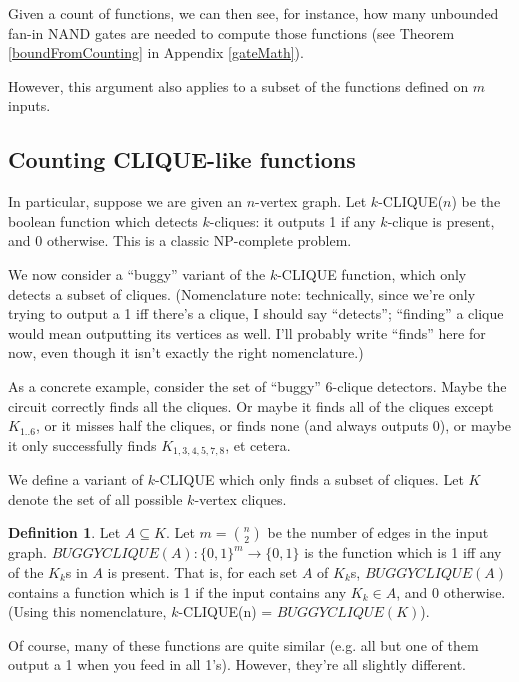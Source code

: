 \documentclass[12pt]{article}
\theoremstyle{definition}
\newtheorem{defn}{Definition}[section]
\begin{document}
Given a count of functions, we can then see, for instance,
how many unbounded fan-in NAND gates are needed to compute
those functions (see Theorem \ref{boundFromCounting}
in Appendix \ref{gateMath}).

However, this argument also applies to a subset of the functions defined
on $m$ inputs.

\subsection{Counting CLIQUE-like functions}

In particular, suppose we are given an $n$-vertex graph.
Let $k$-CLIQUE($n$) be the boolean function which
detects $k$-cliques: it outputs 1 if any $k$-clique
is present, and 0 otherwise. This is a classic
NP-complete problem.

We now consider a ``buggy'' variant of the $k$-CLIQUE function,
which only detects a subset of cliques. (Nomenclature note:
technically, since
we're only trying to output a 1 iff there's a clique, I should say
``detects''; ``finding'' a clique would mean outputting its
vertices as well. I'll probably write ``finds'' here for now,
even though it isn't exactly the right nomenclature.)

As a concrete example,
consider the set of ``buggy'' 6-clique detectors.
Maybe the circuit correctly
finds all the cliques. Or maybe it finds all of the cliques except $K_{1..6}$,
or it misses half the cliques, or finds none (and always outputs 0), or maybe
it only successfully finds $K_{1,3,4,5,7,8}$, et cetera.

We define a variant of $k$-CLIQUE which only
finds a subset of cliques.
Let $K$ denote the set of all possible
$k$-vertex cliques.

\begin{defn}
\label{BUGGYCLIQUE}
Let $A \subseteq K$.
Let $m = {n \choose 2}$ be the number of edges in the input graph.
$BUGGYCLIQUE(A): \{0,1\}^m \rightarrow \{0,1\}$ is the function which
is 1 iff any of the $K_k$s in $A$ is present.
That is, for each set $A$ of $K_k$s, $BUGGYCLIQUE(A)$
contains a function which is 1 if the input contains any $K_k \in A$,
and 0 otherwise. (Using this nomenclature,
$k$-CLIQUE(n) = $BUGGYCLIQUE(K)$).
\end{defn}

Of course, many of these functions are quite similar (e.g. all but one of them
output a 1 when you feed in all 1's). However, they're all slightly different.
\end{document}
